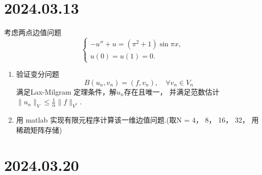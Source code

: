 \documentclass[12pt,a4paper]{article}
\begin{document}
	
	\noindent
	
	\section*{2024.03.13}	
	
	
	考虑两点边值问题
	\begin{equation}
		\left\{
		\begin{array}{l}
			-u'' + u = (\pi^2 +1) \sin{\pi x}, \\
			u(0) = u(1) = 0.
		\end{array}
		\right.
	\end{equation}
	
	\begin{enumerate}
		
		\item 验证变分问题 $$B(u_n, v_n) = (f, v_n),\quad \forall v_n \in V_n$$ 满足Lax-Milgram 定理条件，解$u_n$存在且唯一， 并满足范数估计 $\|u_n\|_V \leq \frac{1}{\alpha} \|f\|_{V^*} $.
		
		\item 用 matlab 实现有限元程序计算该一维边值问题.(取N = 4， 8， 16， 32， 用稀疏矩阵存储)
		
		
	\end{enumerate}
	
	\section*{2024.03.20}
	
\end{document}
